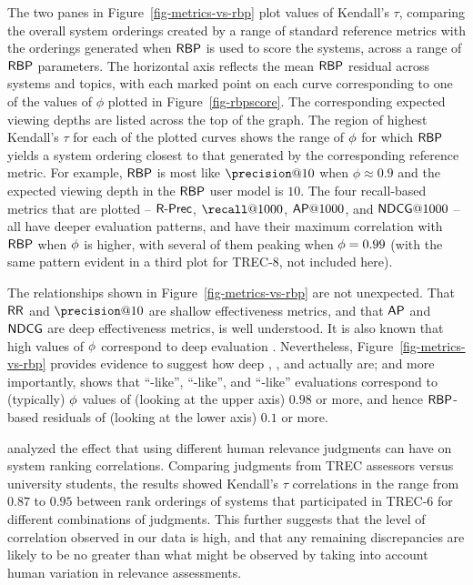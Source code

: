 The two panes in Figure~\ref{fig-metrics-vs-rbp} plot values of
Kendall's $\tau$, comparing the overall system orderings created by a
range of standard reference metrics with the orderings generated when
${\mbox{\sf{RBP}}}$ is used to score the systems, across a range of ${\mbox{\sf{RBP}}}$
parameters.
The horizontal axis reflects the mean ${\mbox{\sf{RBP}}}$ residual across systems
and topics, with each marked point on each curve corresponding to one
of the values of $\phi$ plotted in Figure~\ref{fig-rbpscore}.
The corresponding expected viewing depths are listed across the top
of the graph.
The region of highest Kendall's $\tau$ for each of the plotted curves
shows the range of $\mbox{$\phi$}$ for which ${\mbox{\sf{RBP}}}$ yields a system ordering
closest to that generated by the corresponding reference metric.
For example, ${\mbox{\sf{RBP}}}$ is most like $\precision@10$ when
$\phi\approx0.9$ and the expected viewing depth in the ${\mbox{\sf{RBP}}}$ user
model is $10$.
The four recall-based metrics that are plotted -- ${\mbox{\sf{R-Prec}}}$,
$\recall@1000$, $\ap@1000$, and $\ndcg@1000$ -- all have deeper
evaluation patterns, and have their maximum correlation with ${\mbox{\sf{RBP}}}$
when $\mbox{$\phi$}$ is higher, with several of them peaking when
$\mbox{$\phi$}=0.99$ (with the same pattern evident in a third plot for
TREC-8, not included here).

The relationships shown in Figure~\ref{fig-metrics-vs-rbp} are not
unexpected.
That ${\mbox{\sf{RR}}}$ and $\precision@10$ are shallow effectiveness metrics, and
that ${\mbox{\sf{AP}}}$ and ${\mbox{\sf{NDCG}}}$ are deep effectiveness metrics, is well
understood.
It is also known that high values of $\mbox{$\phi$}$ correspond to deep
evaluation {\citep{mz08acmtois}}.
Nevertheless, Figure~\ref{fig-metrics-vs-rbp} provides evidence to
suggest how deep {\ap}, {\ndcg}, and {\rprec} actually are; and more
importantly, shows that ``{\ap}-like'', ``{\ndcg}-like'', and
``{\rprec}-like'' evaluations correspond to (typically) $\mbox{$\phi$}$
values of (looking at the upper axis) $0.98$ or more, and hence
${\mbox{\sf{RBP}}}$-based residuals of (looking at the lower axis) $0.1$ or more.

{\citet{voorhees2000ipm}} analyzed the effect that using different
human relevance judgments can have on system ranking correlations.
Comparing judgments from TREC assessors versus university students,
the results showed Kendall's $\tau$ correlations in the range from
$0.87$ to $0.95$ between rank orderings of systems that participated in
TREC-6 for different combinations of judgments.
This further suggests that the level of correlation observed in our
data is high, and that any remaining discrepancies are likely to be
no greater than what might be observed by taking into account human
variation in relevance assessments.

